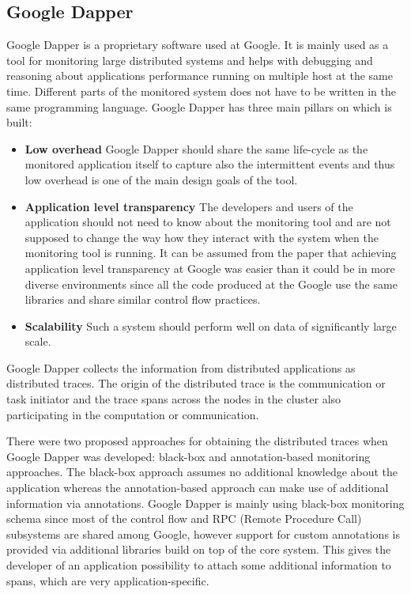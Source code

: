 \subsection{Google Dapper}
\label{dapper}
Google Dapper \cite{DapperPaper} is a proprietary software used at Google. It is mainly used as a tool for monitoring large distributed systems and helps with debugging and reasoning about applications performance running on multiple host at the same time. Different parts of the monitored system does not have to be written in the same programming language. Google Dapper has three main pillars on which is built:
\begin{itemize}
	\item \textbf{Low overhead} \newline
	Google Dapper should share the same life-cycle as the monitored application itself to capture also the intermittent events and thus low overhead is one of the main design goals of the tool.
	\item \textbf{Application level transparency} \newline
	The developers and users of the application should not need to know about the monitoring tool and are not supposed to change the way how they interact with the system when the monitoring tool is running. It can be assumed from the paper that achieving application level transparency at Google was easier than it could be in more diverse environments since all the code produced at the Google use the same libraries and share similar control flow practices.
	\item \textbf{Scalability} \newline
	Such a system should perform well on data of significantly large scale.
\end{itemize}	
Google Dapper collects the information from distributed applications as distributed traces. The origin of the distributed trace is the communication or task initiator and the trace spans across the nodes in the cluster also participating in the computation or communication.
	
There were two proposed approaches for obtaining the distributed traces when Google Dapper was developed: black-box and annotation-based monitoring approaches. The black-box approach assumes no additional knowledge about the application whereas the annotation-based approach can make use of additional information via annotations. Google Dapper is mainly using black-box monitoring schema since most of the control flow and RPC (Remote Procedure Call) subsystems are shared among Google, however support for custom annotations is provided via additional libraries build on top of the core system. This gives the developer of an application possibility to attach some additional information to spans, which are very application-specific.
	
